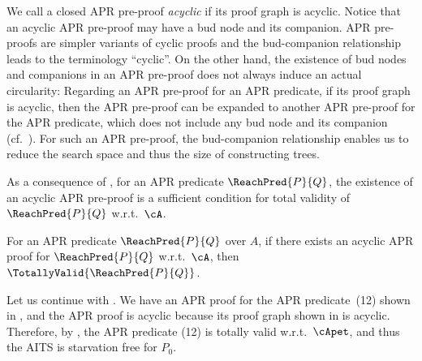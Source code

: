 We call a closed APR pre-proof \emph{acyclic} if its proof graph is acyclic.
Notice that an acyclic APR pre-proof may have a bud node and its companion.
APR pre-proofs are simpler variants of cyclic proofs and the bud-companion relationship leads to the terminology ``cyclic''.
On the other hand, the existence of bud nodes and companions in an APR pre-proof does not always induce an actual circularity:
Regarding an APR pre-proof for an APR predicate, if its proof graph is acyclic, then the APR pre-proof can be expanded to another APR pre-proof for the APR predicate, which does not include any bud node and its companion (cf.~\cite[Section~5]{Bro05}).
For such an APR pre-proof, the bud-companion relationship enables us to reduce the search space and thus the size of constructing trees.

As a consequence of , for an APR predicate $\ReachPred{P}{Q}$, the existence of an acyclic APR pre-proof is a sufficient condition for total validity of $\ReachPred{P}{Q}$ w.r.t.\ $\cA$.
\begin{corollary}
	\label{cor:sufficient-condition-for-total-validity}
	For an APR predicate $\ReachPred{P}{Q}$ over $A$,
	if there exists an acyclic APR proof for $\ReachPred{P}{Q}$ w.r.t.\ $\cA$,
	then $\TotallyValid{\ReachPred{P}{Q}}$.
\end{corollary}

\begin{example}
	\label{ex:total-validity}
	Let us continue with .
	We have an APR proof for the APR predicate~(12) shown in , and the APR proof is acyclic because its proof graph shown in  is acyclic.
	Therefore, by , the APR predicate (12) is totally valid w.r.t.\ $\cApet$, and thus the AITS is starvation free for $P_0$.
\end{example}

